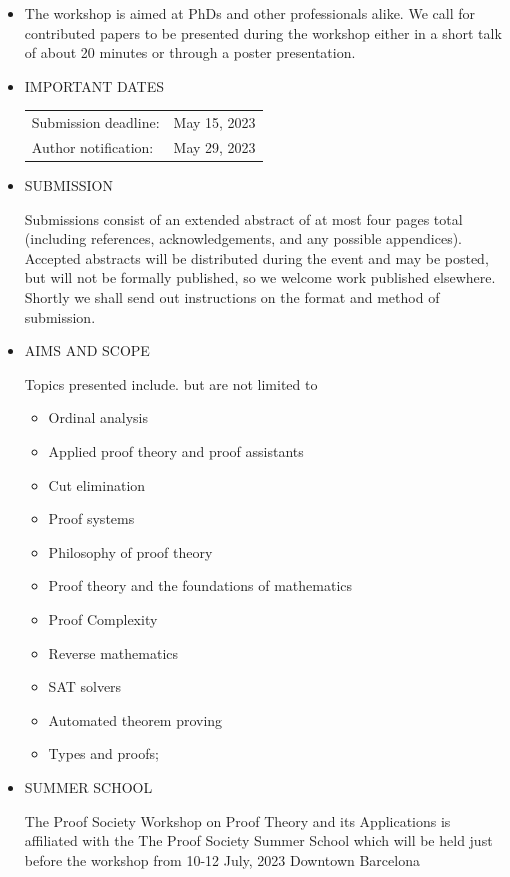 \documentclass[prodmode,acmtecs]{acmsmall} %
\begin{document}
\begin{itemize}\item  The workshop is aimed at PhDs and other professionals alike. We call for contributed papers to be presented during the workshop either in a short talk of about 20 minutes or through a poster presentation. 
 
\item  IMPORTANT DATES 
 
\begin{tabulary}{\linewidth}{LL}Submission deadline:  & May 15, 2023 \\
Author notification:  & May 29, 2023 \\
\end{tabulary}
 
\item  SUBMISSION 
 
  Submissions consist of an extended abstract of at most four pages total (including references, acknowledgements, and any possible appendices). Accepted abstracts will be distributed during the event and may be posted, but will not be formally published, so we welcome work published elsewhere. Shortly we shall send out instructions on the format and method of submission. 
 
\item  AIMS AND SCOPE 
 
  Topics presented include. but are not limited to 
 
\begin{itemize}\item  Ordinal analysis
\item  Applied proof theory and proof assistants
\item  Cut elimination
\item  Proof systems
\item  Philosophy of proof theory
\item  Proof theory and the foundations of mathematics
\item  Proof Complexity
\item  Reverse mathematics
\item  SAT solvers
\item  Automated theorem proving
\item  Types and proofs;
\end{itemize} 
\item  SUMMER SCHOOL 
 
  The Proof Society Workshop on Proof Theory and its Applications is affiliated with the The Proof Society Summer School which will be held just before the workshop from 10-12 July, 2023 Downtown Barcelona 
 

\end{itemize}
\end{document}
